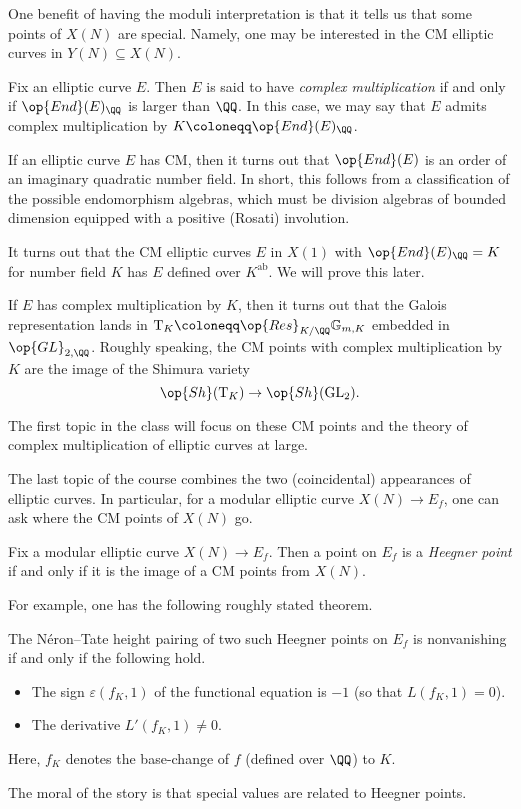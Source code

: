 \documentclass[../notes.tex]{subfiles}
\begin{document}
One benefit of having the moduli interpretation is that it tells us that some points of $X(N)$ are special. Namely, one may be interested in the CM elliptic curves in $Y(N)\subseteq X(N)$.
\begin{definition}
	Fix an elliptic curve $E$. Then $E$ is said to have \textit{complex multiplication} if and only if $\op{End}(E)_\QQ$ is larger than $\QQ$. In this case, we may say that $E$ admits complex multiplication by $K\coloneqq\op{End}(E)_\QQ$.
\end{definition}
\begin{remark}
	If an elliptic curve $E$ has CM, then it turns out that $\op{End}(E)$ is an order of an imaginary quadratic number field. In short, this follows from a classification of the possible endomorphism algebras, which must be division algebras of bounded dimension equipped with a positive (Rosati) involution.
\end{remark}
\begin{remark} \label{rem:cm-over-k-ab}
	It turns out that the CM elliptic curves $E$ in $X(1)$ with $\op{End}(E)_\QQ=K$ for number field $K$ has $E$ defined over $K^{\mathrm{ab}}$. We will prove this later.
\end{remark}
\begin{remark}
	If $E$ has complex multiplication by $K$, then it turns out that the Galois representation lands in $\mathrm T_K\coloneqq\op{Res}_{K/\QQ}\mathbb G_{m,K}$ embedded in $\op{GL}_{2,\QQ}$. Roughly speaking, the CM points with complex multiplication by $K$ are the image of the Shimura variety
	\[\op{Sh}(\mathrm T_K)\to\op{Sh}(\mathrm{GL}_2).\]
\end{remark}
The first topic in the class will focus on these CM points and the theory of complex multiplication of elliptic curves at large.

The last topic of the course combines the two (coincidental) appearances of elliptic curves. In particular, for a modular elliptic curve $X(N)\to E_f$, one can ask where the CM points of $X(N)$ go.
\begin{definition}
	Fix a modular elliptic curve $X(N)\to E_f$. Then a point on $E_f$ is a \textit{Heegner point} if and only if it is the image of a CM points from $X(N)$.
\end{definition}
For example, one has the following roughly stated theorem.
\begin{theorem}
	The N\'eron--Tate height pairing of two such Heegner points on $E_f$ is nonvanishing if and only if the following hold.
	\begin{itemize}
		\item The sign $\varepsilon(f_K,1)$ of the functional equation is $-1$ (so that $L(f_K,1)=0$).
		\item The derivative $L'(f_K,1)\ne0$.
	\end{itemize}
	Here, $f_K$ denotes the base-change of $f$ (defined over $\QQ$) to $K$.
\end{theorem}
The moral of the story is that special values are related to Heegner points.
\end{document}
